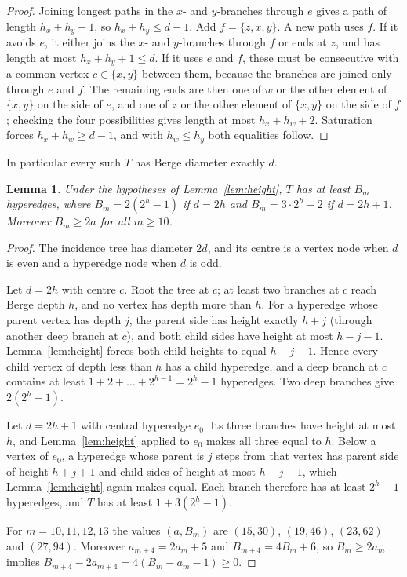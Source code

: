\documentclass[11pt]{article}
\newtheorem{lemma}[theorem]{Lemma}
\theoremstyle{definition}
\theoremstyle{remark}
\begin{document}
\begin{proof}
Joining longest paths in the $x$- and $y$-branches through $e$ gives a
path of length $h_x+h_y+1$, so $h_x+h_y\le d-1$. Add $f=\{z,x,y\}$. A new
path uses $f$. If it avoids $e$, it either joins the $x$- and $y$-branches
through $f$ or ends at $z$, and has length at most $h_x+h_y+1\le d$. If it
uses $e$ and $f$, these must be consecutive with a common vertex
$c\in\{x,y\}$ between them, because the branches are joined only through
$e$ and $f$. The remaining ends are then one of $w$ or the other element of
$\{x,y\}$ on the side of $e$, and one of $z$ or the other element of
$\{x,y\}$ on the side of $f$; checking the four possibilities gives length
at most $h_x+h_w+2$. Saturation forces $h_x+h_w\ge d-1$, and with
$h_w\le h_y$ both equalities follow.
\end{proof}

In particular every such $T$ has Berge diameter exactly $d$.

\begin{lemma}\label{lem:tree}
Under the hypotheses of Lemma~\ref{lem:height}, $T$ has at least $B_m$
hyperedges, where $B_m=2(2^h-1)$ if $d=2h$ and $B_m=3\cdot2^h-2$ if
$d=2h+1$. Moreover $B_m\ge 2a$ for all $m\ge10$.
\end{lemma}

\begin{proof}
The incidence tree has diameter $2d$, and its centre is a vertex node when
$d$ is even and a hyperedge node when $d$ is odd.

Let $d=2h$ with centre $c$. Root the tree at $c$; at least two branches at
$c$ reach Berge depth $h$, and no vertex has depth more than $h$. For a
hyperedge whose parent vertex has depth $j$, the parent side has height
exactly $h+j$ (through another deep branch at $c$), and both child sides
have height at most $h-j-1$. Lemma~\ref{lem:height} forces both child
heights to equal $h-j-1$. Hence every child vertex of depth less than $h$
has a child hyperedge, and a deep branch at $c$ contains at least
$1+2+\dots+2^{h-1}=2^h-1$ hyperedges. Two deep branches give $2(2^h-1)$.

Let $d=2h+1$ with central hyperedge $e_0$. Its three branches have height
at most $h$, and Lemma~\ref{lem:height} applied to $e_0$ makes all three
equal to $h$. Below a vertex of $e_0$, a hyperedge whose parent is $j$
steps from that vertex has parent side of height $h+j+1$ and child sides of
height at most $h-j-1$, which Lemma~\ref{lem:height} again makes equal.
Each branch therefore has at least $2^h-1$ hyperedges, and $T$ has at least
$1+3(2^h-1)$.

For $m=10,11,12,13$ the values $(a,B_m)$ are $(15,30)$, $(19,46)$, $(23,62)$
and $(27,94)$. Moreover $a_{m+4}=2a_m+5$ and $B_{m+4}=4B_m+6$, so
$B_m\ge2a_m$ implies $B_{m+4}-2a_{m+4}=4(B_m-a_m-1)\ge0$.
\end{proof}
\end{document}
